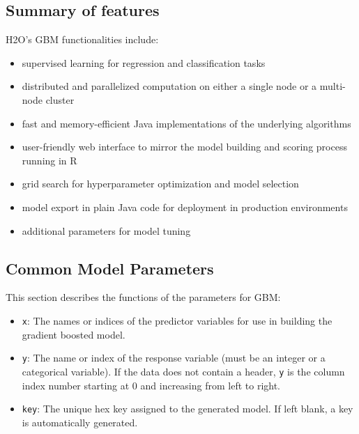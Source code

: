 {\subsection{Summary of features} 
H2O's GBM functionalities include:

\begin{itemize}

\item supervised learning for regression and classification tasks

\item distributed and parallelized computation on either a single node or a multi-node cluster

\item fast and memory-efficient Java implementations of the underlying algorithms

\item user-friendly web interface to mirror the model building and scoring process running in R

\item grid search for hyperparameter optimization and model selection

\item model export in plain Java code for deployment in production environments

\item additional parameters for model tuning

\end{itemize}

\subsection{Common Model Parameters}

This section describes the functions of the parameters for GBM: 

\begin{itemize}

\item {\texttt{x}}: The names or indices of the predictor variables for use in building the gradient boosted model. 

\item {\texttt{y}}: The name or index of the response variable (must be an integer or a categorical variable). If the data does not contain a header, {\texttt{y}} is the column index number starting at 0 and increasing from left to right. 

\item {\texttt{key}}: The unique hex key assigned to the generated model. If left blank, a key is automatically generated. 


\end{itemize}}
